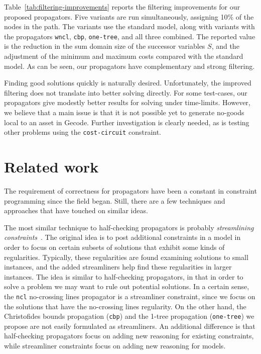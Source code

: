 \documentclass[runningheads]{llncs}
\newcommand{\cons}[1]{\texttt{#1}}
\begin{document}
Table~\ref{tab:filtering-improvements} reports the filtering improvements for our
proposed propagators.  Five variants are run simultaneously, assigning
10\% of the nodes in the path. The variants use the standard model,
along with variants with the propagators \cons{wncl},
\cons{cbp}, \cons{one-tree}, and all three combined. The reported
value is the reduction in the sum domain size of the successor
variables $S$, and the adjustment of the minimum and maximum costs
compared with the standard model. As
can be seen, our propagators have complementary and strong filtering.

Finding good solutions quickly is naturally desired. Unfortunately,
the improved filtering does not translate into better solving
directly. For some test-cases, our propagators give modestly better
results for solving under time-limits. However, we believe that a main
issue is that it is not possible yet to generate no-goods local to an
asset in Gecode. Further investigation is clearly needed, as is
testing other problems using the \cons{cost-circuit} constraint.

\section{Related work}
\label{sec:related}

The requirement of correctness for propagators have been a constant in
constraint programming since the field began. Still, there are a few
techniques and approaches that have touched on similar ideas.

The most similar technique to half-checking propagators is
probably \emph{streamlining constraints}~\cite{Gomes04}. The original
idea is to post additional constraints in a model in order to focus on
certain subsets of solutions that exhibit some kinds of
regularities. Typically, these regularities are found examining
solutions to small instances, and the added streamliners help find
these regularities in larger instances. The idea is similar to
half-checking propagators, in that in order to solve a problem we may
want to rule out potential solutions. In a certain sense, the \cons{ncl}
no-crossing lines propagator is a streamliner constraint, since we
focus on the solutions that have the no-crossing lines regularity. On
the other hand, the Christofides bounds propagation (\cons{cbp}) and
the 1-tree propagation (\cons{one-tree}) we propose are not easily
formulated as streamliners. An additional difference is that
half-checking propagators focus on adding new reasoning for existing
constraints, while streamliner constraints focus on adding new
reasoning for models.
\end{document}
